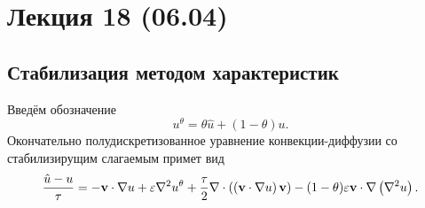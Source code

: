 \section{Лекция 18 (06.04)}

\subsection{Стабилизация методом характеристик}
\label{seq:char-stab}

Введём обозначение
$$
u^\theta = \theta \hat u + \left(1 - \theta\right) u.
$$
Окончательно полудискретизованное уравнение конвекции-диффузии со стабилизирущим слагаемым
примет вид
\begin{equation}
\label{eq:cg_stab_multidim}
\frac{\hat u - u}{\tau} =
-\boldsymbol{\rm v} \cdot \nabla u 
+\varepsilon \nabla^2 u^\theta
+\frac{\tau}{2} \nabla\cdot \left(\left(\boldsymbol{\rm v} \cdot \nabla u\right)\boldsymbol{\rm v}\right)
- (1-\theta)\varepsilon\boldsymbol{\rm v} \cdot \nabla\left(\nabla^2 u\right).
\end{equation}


